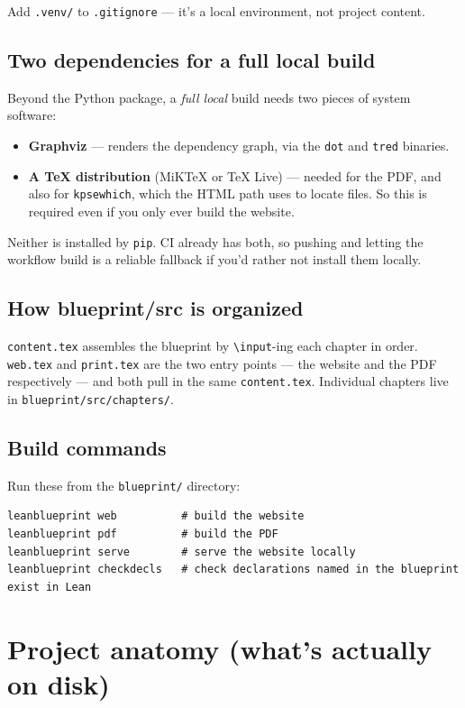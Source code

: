 Add \texttt{.venv/} to \texttt{.gitignore} --- it's a local environment, not project content.

\subsection{Two dependencies for a full local build}

Beyond the Python package, a \emph{full local} build needs two pieces of system software:

\begin{itemize}
  \item \textbf{Graphviz} --- renders the dependency graph, via the \texttt{dot} and \texttt{tred} binaries.
  \item \textbf{A TeX distribution} (MiKTeX or TeX Live) --- needed for the PDF, and also for \texttt{kpsewhich}, which the HTML path uses to locate files. So this is required even if you only ever build the website.
\end{itemize}

Neither is installed by \texttt{pip}. CI already has both, so pushing and letting the workflow build is a reliable fallback if you'd rather not install them locally.

\subsection{How blueprint/src is organized}

\texttt{content.tex} assembles the blueprint by \texttt{\textbackslash{}input}-ing each chapter in order. \texttt{web.tex} and \texttt{print.tex} are the two entry points --- the website and the PDF respectively --- and both pull in the same \texttt{content.tex}. Individual chapters live in \texttt{blueprint/src/chapters/}.

\subsection{Build commands}

Run these from the \texttt{blueprint/} directory:

\begin{verbatim}
leanblueprint web          # build the website
leanblueprint pdf          # build the PDF
leanblueprint serve        # serve the website locally
leanblueprint checkdecls   # check declarations named in the blueprint exist in Lean
\end{verbatim}

\section{Project anatomy (what's actually on disk)}

